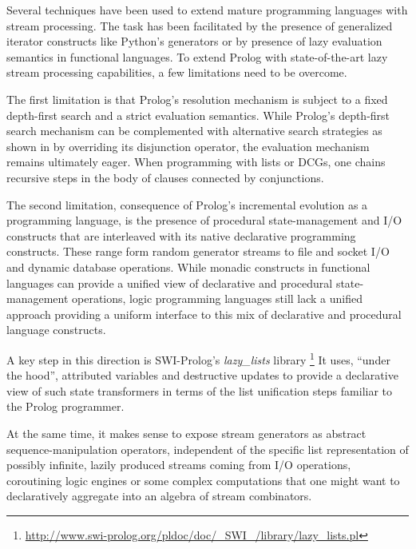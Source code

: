 \documentclass{new_tlp}
\begin{document}
Several techniques have been used to extend mature programming languages with stream processing. The task has been facilitated by the presence of generalized iterator constructs like Python's generators or by presence of lazy evaluation semantics in functional languages. To extend Prolog with state-of-the-art lazy stream processing capabilities, a few limitations need to be overcome.

The first limitation is that Prolog's resolution mechanism is subject to a fixed depth-first search and a strict evaluation semantics.
While Prolog's depth-first  search mechanism can be complemented with alternative search strategies as shown in \cite{tor} by overriding its disjunction operator, the evaluation mechanism remains ultimately eager. When programming with lists or DCGs, one chains recursive steps
in the body of clauses connected by conjunctions. 

The second limitation, consequence of Prolog's incremental evolution as a programming language, is the presence of procedural state-management and I/O constructs that are
interleaved with its native declarative programming constructs. These range form 
random generator streams to file and socket I/O and dynamic database operations.
While monadic constructs in functional languages \cite{moggi:monads,wadler93:cont}  can provide  a unified view of declarative and procedural state-management operations, logic programming languages still lack a unified approach providing a uniform interface to 
this mix of declarative and procedural language constructs.

A key step in this direction is SWI-Prolog's \cite{swi} 
{\em lazy\_lists} library
\footnote{\url{http://www.swi-prolog.org/pldoc/doc/_SWI_/library/lazy_lists.pl}}
 It uses, ``under the hood'', attributed variables and destructive updates  to provide a declarative view of such state transformers in terms of the list unification steps familiar to the Prolog programmer. 
 
At the same time, it makes sense to expose stream generators as abstract sequence-manipulation operators, independent of the specific list representation of
possibly infinite, lazily produced streams coming from I/O operations, coroutining logic engines or some complex computations that one might want to declaratively aggregate into an algebra of stream combinators.
\end{document}
